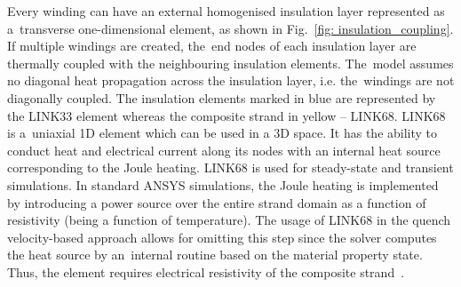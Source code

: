 Every winding can have an external homogenised insulation layer represented as a~transverse one-dimensional element, as shown in Fig.~\ref{fig: insulation_coupling}. If multiple windings are created, the~end nodes of each insulation layer are thermally coupled with the neighbouring insulation elements. The~model assumes no diagonal heat propagation across the insulation layer, i.e. the~windings are not diagonally coupled. The insulation elements marked in blue are represented by the LINK33 element whereas the composite strand in yellow -- LINK68. LINK68 is a~uniaxial 1D element which can be used in a 3D space. It has the ability to conduct heat and electrical current along its nodes with an internal heat source corresponding to the Joule heating. LINK68 is used for steady-state and transient simulations. In standard ANSYS simulations, the Joule heating is implemented by introducing a power source over the entire strand domain as a function of resistivity (being a function of temperature). The usage of LINK68 in the quench velocity-based approach allows for omitting this step since the solver computes the heat source by an~internal routine based on the material property state. Thus, the element requires electrical resistivity of the composite strand~\cite{ansys_element_manual}.

